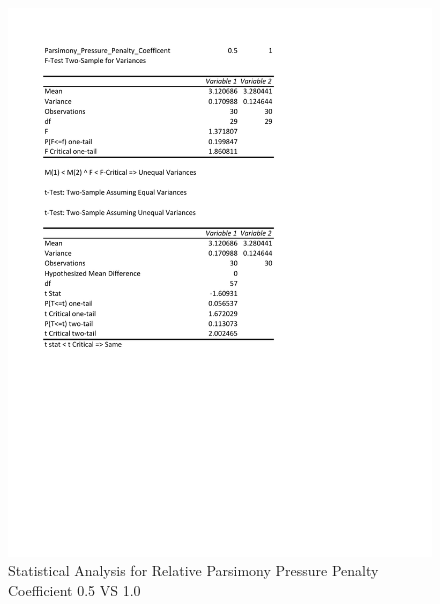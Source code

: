 \documentclass[times]{article}
\begin{document}
	\begin{figure}
		\caption{Statistical Analysis for Relative Parsimony Pressure Penalty Coefficient 0.5 VS 1.0}
		\label{fig:stat_rel_12}
		\includegraphics[width=\textwidth]{./pictures/relative_12.pdf}
	\end{figure}
\end{document}
